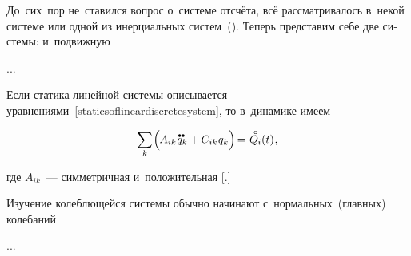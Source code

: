 

\label{para:mechanicsofrelativemotion}

\begin{otherlanguage}{russian}

До~сих~пор не~ставился вопрос о~системе отсчёта, всё рассматривалось в~некой  системе или одной из инерциальных систем~(). Теперь представим себе две системы:  и~подвижную

...



\end{otherlanguage}



\label{para:smalloscillations}

\begin{otherlanguage}{russian}

Если статика линейной системы описывается уравнениями~\eqref{staticsoflineardiscretesystem}, то в~динамике имеем

\nopagebreak\vspace{-0.2em}\begin{equation}\label{dynamicsoflineardiscretesystem}
\scalebox{0.95}[1]{$\displaystyle \sum_{\smash{k}}$} \hspace{-0.2ex} \left(^{\mathstrut} \hspace{-0.2ex} A_{ik} \hspace{.12ex} \mathdotdotabove{q}_k + C_{ik} \hspace{.12ex} q_k \right)
\hspace{-0.25ex} = \hspace{.1ex} \mathcircabove{Q}_{\hspace{-0.1ex}i}(t) \hspace{.1ex} ,
\vspace{-0.1em}\end{equation}

\vspace{-0.2em} \noindent где ${A_{ik}}$~--- симметричная и~положительная [.]

Изучение колеблющейся системы обычно начинают с~нормальных~(главных) колебаний

...


\end{otherlanguage}

